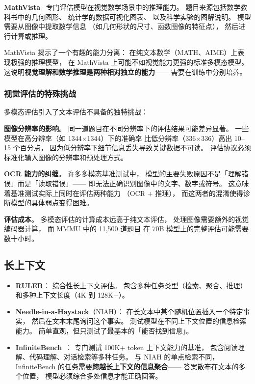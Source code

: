 \textbf{MathVista}~\cite{lu2024mathvista}
专门评估模型在视觉数学场景中的推理能力。
题目来源包括数学教科书中的几何图形、
统计学的数据可视化图表、
以及科学实验的图解说明。
模型需要从图像中提取数学信息
（如几何形状的尺寸、函数图像的特征点），
然后进行计算或推理。

MathVista 揭示了一个有趣的能力分离：
在纯文本数学（MATH、AIME）上表现极强的推理模型，
在 MathVista 上可能不如视觉能力更强的标准多模态模型。
这说明\textbf{视觉理解和数学推理是两种相对独立的能力}——
需要在训练中分别培养。

\subsubsection{视觉评估的特殊挑战}

多模态评估引入了文本评估不具备的独特挑战：

\textbf{图像分辨率的影响}。
同一道题目在不同分辨率下的评估结果可能差异显著。
一些模型在高分辨率（如 1344$\times$1344）下的准确率
比低分辨率（336$\times$336）高出 10--15 个百分点，
因为低分辨率下细节信息丢失导致关键数据不可读。
评估协议必须标准化输入图像的分辨率和预处理方式。

\textbf{OCR 能力的纠缠}。
许多多模态基准测试中，
模型的主要失败原因不是「理解错误」而是「读取错误」——
即无法正确识别图像中的文字、数字或符号。
这意味着基准测试实际上同时在评估两种能力
（OCR + 推理），
而这两者的混淆使得诊断模型的具体弱点变得困难。

\textbf{评估成本}。
多模态评估的计算成本远高于纯文本评估，
处理图像需要额外的视觉编码器计算，
而 MMMU 中的 11,500 道题目
在 70B 模型上的完整评估可能需要数十小时。

\subsection{长上下文}
\begin{itemize}[noitemsep]
  \item \textbf{RULER}：
        综合性长上下文评估。
        包含多种任务类型（检索、聚合、推理）
        和多种上下文长度（4K 到 128K+）。
  \item \textbf{Needle-in-a-Haystack}（NIAH）：
        在长文本中某个随机位置插入一个特定事实，
        然后在文本末尾询问这个事实。
        测试模型在不同上下文位置的信息检索能力。
        简单直观，但只测试了最基本的「能否找到信息」。
  \item \textbf{InfiniteBench}~\cite{zhang2024infinitebench}：
        专门测试 100K+ token 上下文能力的基准，
        包含阅读理解、代码理解、对话检索等多种任务。
        与 NIAH 的单点检索不同，
        InfiniteBench 的任务需要\textbf{跨越长上下文的信息聚合}——
        答案散布在文本的多个位置，
        模型必须综合多处信息才能正确回答。
\end{itemize}

